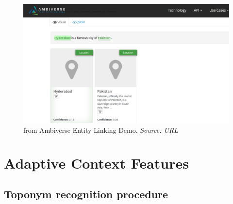 \documentclass{beamer}
\begin{document}
{\begin{overprint}
		\begin{figure}
			\includegraphics[width=\textwidth]{ambi.png} 
			\caption{from Ambiverse Entity Linking Demo, \textit{Source: URL}}
		\end{figure}
	
	\end{overprint}
	
	\vfill
} %



\section[Adaptive Context Features]{Adaptive Context Features}

\subsection{Toponym recognition procedure}
\end{document}
